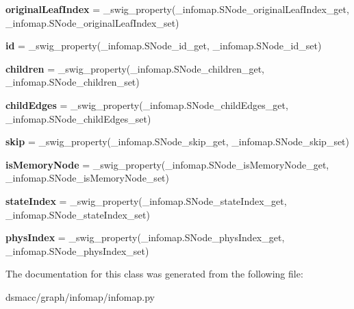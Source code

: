 \begin{DoxyCompactItemize}
\item 
\mbox{\label{classdsmacc_1_1graph_1_1infomap_1_1infomap_1_1SNode_a8bb5c257232b994944aab20614d992c2}} 
{\bfseries original\+Leaf\+Index} = \+\_\+swig\+\_\+property(\+\_\+infomap.\+S\+Node\+\_\+original\+Leaf\+Index\+\_\+get, \+\_\+infomap.\+S\+Node\+\_\+original\+Leaf\+Index\+\_\+set)
\item 
\mbox{\label{classdsmacc_1_1graph_1_1infomap_1_1infomap_1_1SNode_a619b231db220ae1387c30261dfcc554f}} 
{\bfseries id} = \+\_\+swig\+\_\+property(\+\_\+infomap.\+S\+Node\+\_\+id\+\_\+get, \+\_\+infomap.\+S\+Node\+\_\+id\+\_\+set)
\item 
\mbox{\label{classdsmacc_1_1graph_1_1infomap_1_1infomap_1_1SNode_a7c307081e00a762ef5c7805352cdeceb}} 
{\bfseries children} = \+\_\+swig\+\_\+property(\+\_\+infomap.\+S\+Node\+\_\+children\+\_\+get, \+\_\+infomap.\+S\+Node\+\_\+children\+\_\+set)
\item 
\mbox{\label{classdsmacc_1_1graph_1_1infomap_1_1infomap_1_1SNode_a2f9c589412f27767afa45b514739b723}} 
{\bfseries child\+Edges} = \+\_\+swig\+\_\+property(\+\_\+infomap.\+S\+Node\+\_\+child\+Edges\+\_\+get, \+\_\+infomap.\+S\+Node\+\_\+child\+Edges\+\_\+set)
\item 
\mbox{\label{classdsmacc_1_1graph_1_1infomap_1_1infomap_1_1SNode_aa19dc5a2e9b2f78553ed5caf7b318b5a}} 
{\bfseries skip} = \+\_\+swig\+\_\+property(\+\_\+infomap.\+S\+Node\+\_\+skip\+\_\+get, \+\_\+infomap.\+S\+Node\+\_\+skip\+\_\+set)
\item 
\mbox{\label{classdsmacc_1_1graph_1_1infomap_1_1infomap_1_1SNode_a1b495008548687c904273600f854f900}} 
{\bfseries is\+Memory\+Node} = \+\_\+swig\+\_\+property(\+\_\+infomap.\+S\+Node\+\_\+is\+Memory\+Node\+\_\+get, \+\_\+infomap.\+S\+Node\+\_\+is\+Memory\+Node\+\_\+set)
\item 
\mbox{\label{classdsmacc_1_1graph_1_1infomap_1_1infomap_1_1SNode_a2dee544b7ee1df7a2b9fc762239b2898}} 
{\bfseries state\+Index} = \+\_\+swig\+\_\+property(\+\_\+infomap.\+S\+Node\+\_\+state\+Index\+\_\+get, \+\_\+infomap.\+S\+Node\+\_\+state\+Index\+\_\+set)
\item 
\mbox{\label{classdsmacc_1_1graph_1_1infomap_1_1infomap_1_1SNode_a9e4aa42fad334462c19c87f23252258c}} 
{\bfseries phys\+Index} = \+\_\+swig\+\_\+property(\+\_\+infomap.\+S\+Node\+\_\+phys\+Index\+\_\+get, \+\_\+infomap.\+S\+Node\+\_\+phys\+Index\+\_\+set)
\end{DoxyCompactItemize}


The documentation for this class was generated from the following file\+:\begin{DoxyCompactItemize}
\item 
dsmacc/graph/infomap/infomap.\+py\end{DoxyCompactItemize}
